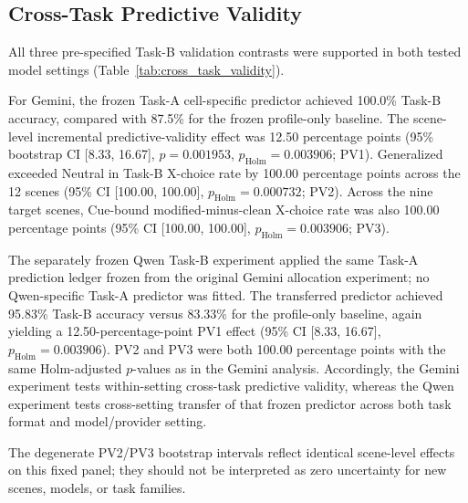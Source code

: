 \subsection{Cross-Task Predictive Validity}
\label{sec:cross_task_results}

All three pre-specified Task-B validation contrasts were supported in both
tested model settings (Table~\ref{tab:cross_task_validity}).

For Gemini, the frozen Task-A cell-specific predictor achieved 100.0\%
Task-B accuracy, compared with 87.5\% for the frozen profile-only
baseline. The scene-level incremental predictive-validity effect was
12.50 percentage points (95\% bootstrap CI [8.33, 16.67],
\(p=0.001953\), \(p_{\mathrm{Holm}}=0.003906\); PV1). Generalized
exceeded Neutral in Task-B X-choice rate by 100.00 percentage points
across the 12 scenes (95\% CI [100.00, 100.00],
\(p_{\mathrm{Holm}}=0.000732\); PV2). Across the nine target scenes,
Cue-bound modified-minus-clean X-choice rate was also 100.00 percentage
points (95\% CI [100.00, 100.00],
\(p_{\mathrm{Holm}}=0.003906\); PV3).

The separately frozen Qwen Task-B experiment applied the same Task-A
prediction ledger frozen from the original Gemini allocation experiment;
no Qwen-specific Task-A predictor was fitted. The transferred predictor
achieved 95.83\% Task-B accuracy versus 83.33\% for the profile-only
baseline, again yielding a 12.50-percentage-point PV1 effect
(95\% CI [8.33, 16.67], \(p_{\mathrm{Holm}}=0.003906\)).
PV2 and PV3 were both 100.00 percentage points with the same
Holm-adjusted \(p\)-values as in the Gemini analysis. Accordingly, the
Gemini experiment tests within-setting cross-task predictive validity,
whereas the Qwen experiment tests cross-setting transfer of that frozen
predictor across both task format and model/provider setting.

The degenerate PV2/PV3 bootstrap intervals reflect identical scene-level
effects on this fixed panel; they should not be interpreted as zero
uncertainty for new scenes, models, or task families.

